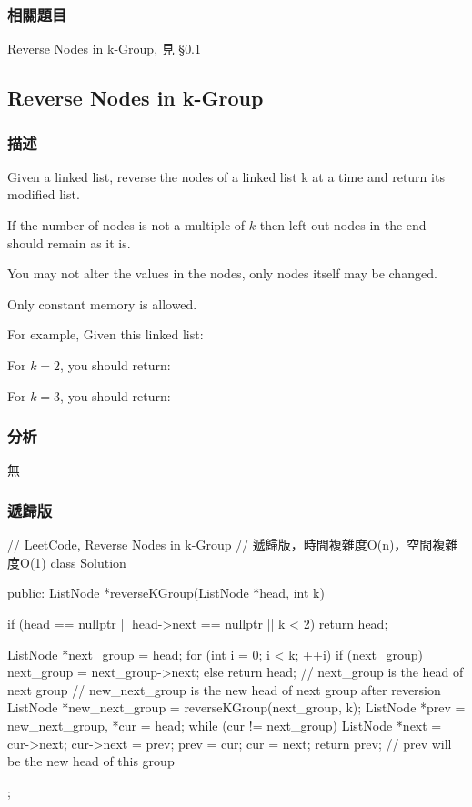 \subsubsection{相關題目}

\begindot
\item Reverse Nodes in k-Group, 見 \S \ref{sec:reverse-nodes-in-k-group}
\myenddot


\subsection{Reverse Nodes in k-Group}
\label{sec:reverse-nodes-in-k-group}


\subsubsection{描述}
Given a linked list, reverse the nodes of a linked list k at a time and return its modified list.

If the number of nodes is not a multiple of $k$ then left-out nodes in the end should remain as it is.

You may not alter the values in the nodes, only nodes itself may be changed.

Only constant memory is allowed.

For example,
Given this linked list: 

For $k = 2$, you should return: 

For $k = 3$, you should return: 


\subsubsection{分析}
無


\subsubsection{遞歸版}
\begin{Code}
// LeetCode, Reverse Nodes in k-Group
// 遞歸版，時間複雜度O(n)，空間複雜度O(1)
class Solution {
public:
    ListNode *reverseKGroup(ListNode *head, int k) {
        if (head == nullptr || head->next == nullptr || k < 2)
            return head;

        ListNode *next_group = head;
        for (int i = 0; i < k; ++i) {
            if (next_group)
                next_group = next_group->next;
            else
                return head;
        }
        // next_group is the head of next group
        // new_next_group is the new head of next group after reversion
        ListNode *new_next_group = reverseKGroup(next_group, k);
        ListNode *prev = new_next_group, *cur = head;
        while (cur != next_group) {
            ListNode *next = cur->next;
            cur->next = prev;
            prev = cur;
            cur = next;
        }
        return prev; // prev will be the new head of this group
    }
};
\end{Code}


